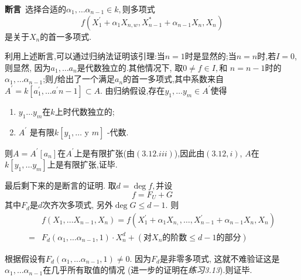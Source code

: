 \documentclass[UTF8]{book}
\begin{document}
		
		\textbf{断言}\ 选择合适的$\alpha_{1}, \dots \alpha_{n-1} \in k,$则多项式
		\begin{equation*}
		f \left(X _{1}^{\prime}+\alpha_{1} X _{ n , w }, X _{ n -1}^{*}+\alpha_{ n -1} X _{ n }, X _{ n }\right)
		\end{equation*}
		是关于$X _{ n }$的首一多项式.
		
		
		利用上述断言,可以通过归纳法证明该引理:当$ n = 1 $时是显然的;当$ n = n $时,若$I=0$,则显然, 因为$a_{1}, \dots a_{n}$是代数独立的.其他情况下, 取$0 \neq f \in I,$和 $ n = n-1 $时的$\alpha_{1}, \ldots \alpha_{n-1}$;则$f$给出了一个满足$ a_{n} $的首一多项式,其中系数来自$A ^{\prime}= k \left[ a _{1}^{\prime}, \ldots a ^{\prime} n -1\right] \subset A .$ 由归纳假设,存在$y_{1}, \dots y_{m} \in A^{\prime}$使得
		
		\begin{enumerate}[(1)]
			\item $y _{1} \ldots y _{ m }$在$k$上时代数独立的;
			\item $A^{\prime}$ 是有限$k \left[y_{1}, \dots \text { y } m \right]$ -代数. 
		\end{enumerate}
		
		
		则$A = A ^{\prime}\left[ a _{ n }\right]$在$A ^{\prime}$上是有限扩张(由$ (3.12.iii) $),因此由$(3.12, i )$, $ A $在$k \left[ y _{1}, \ldots y _{ m }\right]$上是有限扩张,证毕.
		
		
		
		最后剩下来的是断言的证明. 取$d =\operatorname{deg} f ,$并设
		\begin{equation*}
		f = F _{ U }+ G
		\end{equation*}
		其中$F _{ d }$是$d$次齐次多项式, 另外$\operatorname{deg} G \leq d -1 .$ 则
		\begin{equation*}
		\begin{split}
		&f\left(X_{1}, \dots X_{n-1}, X_{n}\right)=f\left(X_{1}^{\prime}+\alpha_{1} X_{n, },\ldots, X_{n-1}^{\prime}+\alpha_{n-1} X_{n}, X_{n}\right)\\
		=&F _{ d }\left(\alpha_{1}, \ldots \alpha_{n-1}, 1\right) \cdot X _{ n }^{d} +\left(\text {对} X _{ n } \text {的阶数} \leq d -1\text{的部分}\right)
		\end{split}
		\end{equation*}
		
		根据假设有$F _{ d }\left(\alpha_{1}, \ldots \alpha_{ n -1}, 1\right) \neq 0 .$ 因为$F _{ d }$是非零多项式, 这就不难验证这是 $\alpha_{1}, \ldots \alpha_{n-1}$在几乎所有取值的情况 (进一步的证明在\textit{练习3.13}).则证毕.
		
\end{document}
